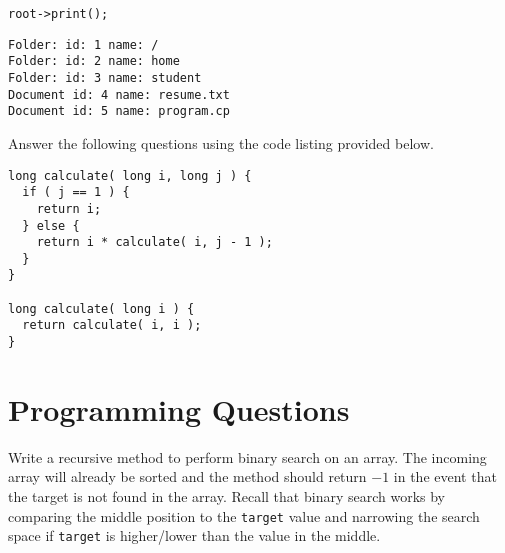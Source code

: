 \documentclass[11pt,answers]{exam}
\begin{document}
\begin{questions}
\begin{parts}
\begin{lstlisting}
root->print();  
\end{lstlisting}
\begin{solution}
\begin{verbatim}
Folder: id: 1 name: /
Folder: id: 2 name: home
Folder: id: 3 name: student
Document id: 4 name: resume.txt
Document id: 5 name: program.cp  
\end{verbatim}
\end{solution}

\end{parts}

\newpage
\question Answer the following questions using the code listing provided below.
\begin{lstlisting}
long calculate( long i, long j ) {
  if ( j == 1 ) {
    return i;
  } else {
    return i * calculate( i, j - 1 );
  }
}
   
long calculate( long i ) {
  return calculate( i, i );
}
\end{lstlisting}


\newpage
\section*{Programming Questions}

\question[15] Write a recursive method to perform binary search on an array. The incoming array will already be sorted and the method should return $-1$ in the event that the target is not found in the array. Recall that binary search works by comparing the middle position to the {\tt target} value and narrowing the search space if {\tt target} is higher/lower than the value in the middle.


\end{questions}
\end{document}
